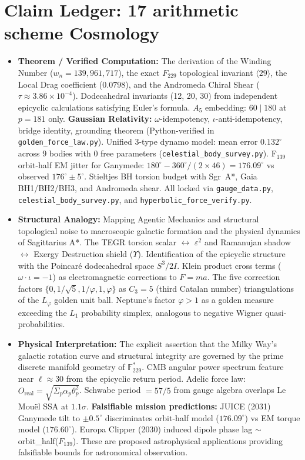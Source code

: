 \section*{Claim Ledger: 17 arithmetic scheme Cosmology}
\begin{itemize}[noitemsep]
    \item \textbf{Theorem / Verified Computation:} The derivation of the Winding Number ($w_n = 139,961,717$), the exact $F_{229}$ topological invariant $\langle 29 \rangle$, the Local Drag coefficient ($0.0798$), and the Andromeda Chiral Shear ($\tau \approx 3.86 \times 10^{-4}$). Dodecahedral invariants (12, 20, 30) from independent epicyclic calculations satisfying Euler's formula. $A_5$ embedding: $60 \mid 180$ at $p = 181$ only. \textbf{Gaussian Relativity:} $\omega$-idempotency, $\iota$-anti-idempotency, bridge identity, grounding theorem (Python-verified in \texttt{golden\_force\_law.py}). Unified 3-type dynamo model: mean error $0.132^\circ$ across 9 bodies with 0 free parameters (\texttt{celestial\_body\_survey.py}). F$_{139}$ orbit-half EM jitter for Ganymede: $180^\circ - 360^\circ/(2 \times 46) = 176.09^\circ$ vs observed $176^\circ \pm 5^\circ$. Stieltjes BH torsion budget with Sgr~A*, Gaia BH1/BH2/BH3, and Andromeda shear. All locked via \texttt{gauge\_data.py}, \texttt{celestial\_body\_survey.py}, and \texttt{hyperbolic\_force\_verify.py}.
    \item \textbf{Structural Analogy:} Mapping Agentic Mechanics and structural topological noise to macroscopic galactic formation and the physical dynamics of Sagittarius A*. The TEGR torsion scalar $\leftrightarrow$ $\varepsilon^2$ and Ramanujan shadow $\leftrightarrow$ Exergy Destruction shield ($\Upsilon$). Identification of the epicyclic structure with the Poincar\'{e} dodecahedral space $S^3/2I$. Klein product cross terms ($\omega\cdot\iota = -1$) as electromagnetic corrections to $F = ma$. The five correction factors $\{0, 1/\sqrt{5}, 1/\varphi, 1, \varphi\}$ as $C_3 = 5$ (third Catalan number) triangulations of the $L_\varphi$ golden unit ball. Neptune's factor $\varphi > 1$ as a golden measure exceeding the $L_1$ probability simplex, analogous to negative Wigner quasi-probabilities.
    \item \textbf{Physical Interpretation:} The explicit assertion that the Milky Way's galactic rotation curve and structural integrity are governed by the prime discrete manifold geometry of $\mathbb{F}_{229}^*$. CMB angular power spectrum feature near $\ell \approx 30$ from the epicyclic return period. Adelic force law: $O_{\text{real}} = \sqrt{\Sigma_p \alpha_p \theta_p^2}$. Schwabe period $= 57/5$ from gauge algebra overlaps Le Mou\"el SSA at $1.1\sigma$. \textbf{Falsifiable mission predictions:} JUICE (2031) Ganymede tilt to $\pm 0.5^\circ$ discriminates orbit-half model ($176.09^\circ$) vs EM torque model ($176.60^\circ$). Europa Clipper (2030) induced dipole phase lag $\sim$ orbit\_half($F_{139}$). These are proposed astrophysical applications providing falsifiable bounds for astronomical observation.
\end{itemize}

